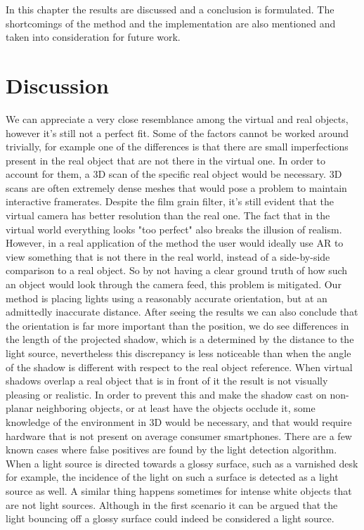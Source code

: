 In this chapter the results are discussed and a conclusion is formulated. The shortcomings of the method and the implementation are also mentioned and taken into consideration for future work.

\section{Discussion}
We can appreciate a very close resemblance among the virtual and real objects, however it's still not a perfect fit. Some of the factors cannot be worked around trivially, for example one of the differences is that there are small imperfections present in the real object that are not there in the virtual one. In order to account for them, a 3D scan of the specific real object would be necessary. 3D scans are often extremely dense meshes that would pose a problem to maintain interactive framerates.\newline
Despite the film grain filter, it's still evident that the virtual camera has better resolution than the real one. The fact that in the virtual world everything looks "too perfect" also breaks the illusion of realism. However, in a real application of the method the user would ideally use AR to view something that is not there in the real world, instead of a side-by-side comparison to a real object. So by not having a clear ground truth of how such an object would look through the camera feed, this problem is mitigated.\newline
Our method is placing lights using a reasonably accurate orientation, but at an admittedly inaccurate distance. After seeing the results we can also conclude that the orientation is far more important than the position, we do see differences in the length of the projected shadow, which is a determined by the distance to the light source, nevertheless this discrepancy is less noticeable than when the angle of the shadow is different with respect to the real object reference.\newline
When virtual shadows overlap a real object that is in front of it the result is not visually pleasing or realistic. In order to prevent this and make the shadow cast on non-planar neighboring objects, or at least have the objects occlude it, some knowledge of the environment in 3D would be necessary, and that would require hardware that is not present on average consumer smartphones.\newline
There are a few known cases where false positives are found by the light detection algorithm. When a light source is directed towards a glossy surface, such as a varnished desk for example, the incidence of the light on such a surface is detected as a light source as well. A similar thing happens sometimes for intense white objects that are not light sources. Although in the first scenario it can be argued that the light bouncing off a glossy surface could indeed be considered a light source. \newline
